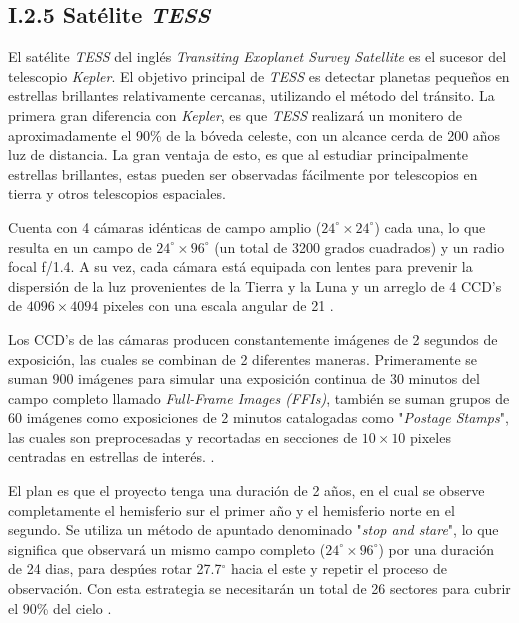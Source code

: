 \subsection*{I.2.5 Satélite \textit{TESS}}

El satélite \textit{TESS} del inglés \textit{Transiting Exoplanet Survey Satellite} es el sucesor del telescopio \textit{Kepler}. El objetivo principal de \textit{TESS} es detectar planetas pequeños en estrellas brillantes relativamente cercanas, utilizando el método del tránsito. La primera gran diferencia con \textit{Kepler}, es que \textit{TESS} realizará un monitero de aproximadamente el 90\% de la bóveda celeste, con un alcance cerda de 200 años luz de distancia. La gran ventaja de esto, es que al estudiar principalmente estrellas brillantes, estas pueden ser observadas fácilmente por telescopios en tierra y otros telescopios espaciales. 

Cuenta con 4 cámaras idénticas de campo amplio ($24^{\circ} \times 24^{\circ}$) cada una, lo que resulta en un campo de $24^{\circ} \times 96^{\circ}$ (un total de 3200 grados cuadrados) y un radio focal f/1.4. A su vez, cada cámara está equipada con lentes para prevenir la dispersión de la luz provenientes de la Tierra y la Luna y un arreglo de 4 CCD’s de $4096\times 4094$ pixeles con una escala angular de 21 .

Los CCD's de las cámaras producen constantemente imágenes de 2 segundos de exposición, las cuales se combinan de 2 diferentes maneras. Primeramente se suman 900 imágenes para simular una exposición continua de 30 minutos del campo completo llamado \textit{ Full-Frame Images (FFIs)}, también se suman grupos de 60 imágenes como exposiciones de 2 minutos catalogadas como "\textit{Postage Stamps}", las cuales son preprocesadas y recortadas en secciones de $10\times 10$ pixeles centradas en estrellas de interés. \cite{ricker2014transiting}.

El plan es que el proyecto tenga una duración de 2 años, en el cual se observe completamente el hemisferio sur el primer año y el hemisferio norte en el segundo. Se utiliza un método de apuntado denominado "\textit{stop and stare}", lo que significa que observará un mismo campo completo ($24^{\circ} \times 96^{\circ}$) por una duración de 24 dias, para despúes rotar 27.7$^{\circ}$ hacia el este y repetir el proceso de observación. Con esta estrategia se necesitarán un total de 26 sectores para cubrir el 90\% del cielo \citep{schliegel2017tess}.

